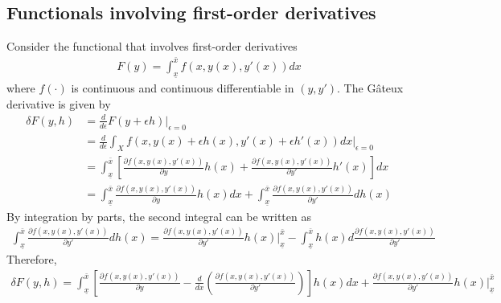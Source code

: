 \documentclass[11pt]{elegantbook}
\begin{document}
\subsection{Functionals involving first-order derivatives}
Consider the functional that involves first-order derivatives
\begin{equation}
    \begin{aligned}
        F(y)=\int_{\underline{x}}^{\bar{x}} f(x,y(x),y'(x))dx
    \end{aligned}
    \nonumber
\end{equation}
where $f(\cdot)$ is continuous and continuous differentiable in $(y,y')$. The Gâteux derivative is given by
\begin{equation}
    \begin{aligned}
        \delta F(y,h)&=\frac{d}{d \epsilon} F(y+\epsilon h)\bigg|_{\epsilon=0}\\
        &=\frac{d}{d \epsilon} \int_X f(x,y(x)+\epsilon h(x),y'(x)+\epsilon h'(x))dx\bigg|_{\epsilon=0}\\
        &=\int_{\underline{x}}^{\bar{x}} \left[\frac{\partial f(x,y(x),y'(x))}{\partial y}h(x)+ \frac{\partial f(x,y(x),y'(x))}{\partial y'}h'(x)\right] dx\\
        &=\int_{\underline{x}}^{\bar{x}} \frac{\partial f(x,y(x),y'(x))}{\partial y}h(x) dx + \int_{\underline{x}}^{\bar{x}} \frac{\partial f(x,y(x),y'(x))}{\partial y'}d h(x)
    \end{aligned}
    \nonumber
\end{equation}
By integration by parts, the second integral can be written as
\begin{equation}
    \begin{aligned}
        \int_{\underline{x}}^{\bar{x}} \frac{\partial f(x,y(x),y'(x))}{\partial y'}d h(x) = \frac{\partial f(x,y(x),y'(x))}{\partial y'}h(x)\bigg|_{\underline{x}}^{\bar{x}}-\int_{\underline{x}}^{\bar{x}} h(x) d \frac{\partial f(x,y(x),y'(x))}{\partial y'}
    \end{aligned}
    \nonumber
\end{equation}
Therefore,
\begin{equation}
    \begin{aligned}
        \delta F(y,h)= \int_{\underline{x}}^{\bar{x}} \left[\frac{\partial f(x,y(x),y'(x))}{\partial y}-\frac{d}{dx}\left(\frac{\partial f(x,y(x),y'(x))}{\partial y'}\right)\right] h(x) dx + \frac{\partial f(x,y(x),y'(x))}{\partial y'}h(x)\bigg|_{\underline{x}}^{\bar{x}}
    \end{aligned}
    \nonumber
\end{equation}
\end{document}
